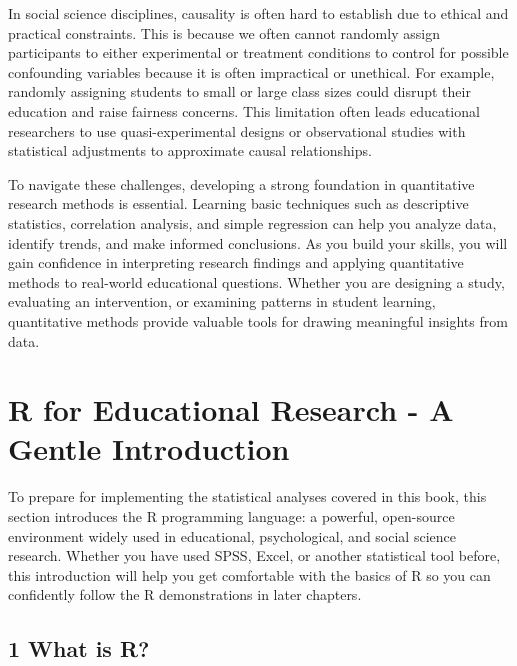 \documentclass[
  letterpaper,
  DIV=11,
  numbers=noendperiod]{scrreprt}
\begin{document}
In social science disciplines, causality is often hard to establish due
to ethical and practical constraints. This is because we often cannot
randomly assign participants to either experimental or treatment
conditions to control for possible confounding variables because it is
often impractical or unethical. For example, randomly assigning students
to small or large class sizes could disrupt their education and raise
fairness concerns. This limitation often leads educational researchers
to use quasi-experimental designs or observational studies with
statistical adjustments to approximate causal relationships.

To navigate these challenges, developing a strong foundation in
quantitative research methods is essential. Learning basic techniques
such as descriptive statistics, correlation analysis, and simple
regression can help you analyze data, identify trends, and make informed
conclusions. As you build your skills, you will gain confidence in
interpreting research findings and applying quantitative methods to
real-world educational questions. Whether you are designing a study,
evaluating an intervention, or examining patterns in student learning,
quantitative methods provide valuable tools for drawing meaningful
insights from data.


\chapter*{R for Educational Research - A Gentle
Introduction}\label{r-for-educational-research---a-gentle-introduction}


To prepare for implementing the statistical analyses covered in this
book, this section introduces the R programming language: a powerful,
open-source environment widely used in educational, psychological, and
social science research. Whether you have used SPSS, Excel, or another
statistical tool before, this introduction will help you get comfortable
with the basics of R so you can confidently follow the R demonstrations
in later chapters.

\section*{1 What is R?}\label{what-is-r}
\end{document}
